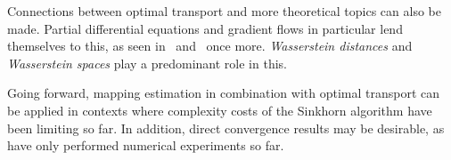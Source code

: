 Connections between optimal transport and more theoretical topics can also be made. Partial differential equations and gradient flows in particular lend themselves to this, as seen in\ \cite{Ambr2005} and\ \cite{San2015} once more. \textit{Wasserstein distances} and \textit{Wasserstein spaces} play a predominant role in this.

Going forward, mapping estimation in combination with optimal transport can be applied in contexts where complexity costs of the Sinkhorn algorithm have been limiting so far. In addition, direct convergence results may be desirable, as\ \cite{Seg2018} have only performed numerical experiments so far.




